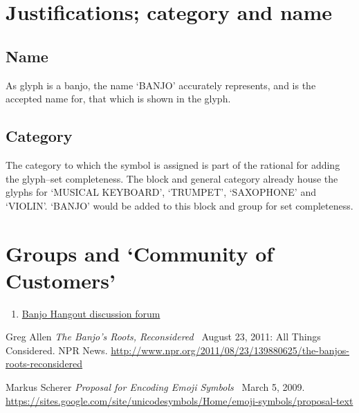 \documentclass[12pt]{article}
\begin{document}
  \section{Justifications; category and name}
    \subsection{Name}
    As glyph is a banjo, the name `BANJO' accurately represents, and is 
    the accepted name for, that which is shown in the glyph.

    \subsection{Category}
    The category to which the symbol is assigned is part of the rational for
    adding the glyph--set completeness. The block and general category already
    house the glyphs for `MUSICAL KEYBOARD', `TRUMPET', `SAXOPHONE' and `VIOLIN'. 
    `BANJO' would be added to this block and group for set completeness.

  \section{Groups and `Community of Customers'}
    \begin{enumerate}
      \item \href{http://www.banjohangout.org/topic/278863}{Banjo Hangout discussion forum}
    \end{enumerate}

  \begin{thebibliography}{1}
     Greg Allen {\em The Banjo's Roots, Reconsidered } \
      August 23, 2011: All Things Considered. NPR News.
      \url{http://www.npr.org/2011/08/23/139880625/the-banjos-roots-reconsidered}

     Markus Scherer {\em Proposal for Encoding Emoji Symbols } \
      March 5, 2009.
      \url{https://sites.google.com/site/unicodesymbols/Home/emoji-symbols/proposal-text}
  \end{thebibliography}
\end{document}
